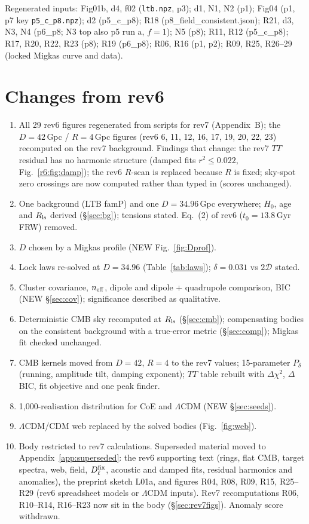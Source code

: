 \documentclass[11pt]{article}
\begin{document}
\noindent Regenerated inputs: Fig01b, d4, f02 (\texttt{ltb.npz}, p3); d1, N1, N2 (p1); Fig04 (p1, p7 key \texttt{p5\_c\_p8.npz}); d2 (p5\_c\_p8); R18 (p8\_field\_consistent.json); R21, d3, N3, N4 (p6\_p8; N3 top also p5 run a, $f=1$); N5 (p8); R11, R12 (p5\_c\_p8); R17, R20, R22, R23 (p8); R19 (p6\_p8); R06, R16 (p1, p2); R09, R25, R26--29 (locked Migkas curve and data).

\section{Changes from rev6}
\begin{enumerate}\itemsep1pt
\item All 29 rev6 figures regenerated from scripts for rev7 (Appendix~B); the $D=42$\,Gpc / $R=4$\,Gpc figures (rev6 6, 11, 12, 16, 17, 19, 20, 22, 23) recomputed on the rev7 background. Findings that change: the rev7 $TT$ residual has no harmonic structure (damped fits $r^2\le0.022$, Fig.~\ref{r6:fig:damp}); the rev6 $R$-scan is replaced because $R$ is fixed; sky-spot zero crossings are now computed rather than typed in (scores unchanged).
\item One background (LTB famP) and one $D=34.96$\,Gpc everywhere; $H_0$, age and $R_{\rm ls}$ derived (\S\ref{sec:bg}); tensions stated. Eq.~(2) of rev6 ($t_0=13.8$\,Gyr FRW) removed.
\item $D$ chosen by a Migkas profile (NEW Fig.~\ref{fig:Dprof}).
\item Lock laws re-solved at $D=34.96$ (Table~\ref{tab:laws}); $\delta=0.031$ vs $2\mathcal D$ stated.
\item Cluster covariance, $n_{\rm eff}$, dipole and dipole + quadrupole comparison, BIC (NEW \S\ref{sec:cov}); significance described as qualitative.
\item Deterministic CMB sky recomputed at $R_{\rm ls}$ (\S\ref{sec:cmb}); compensating bodies on the consistent background with a true-error metric (\S\ref{sec:comp}); Migkas fit checked unchanged.
\item CMB kernels moved from $D=42$, $R=4$ to the rev7 values; 15-parameter $P_\delta$ (running, amplitude tilt, damping exponent); $TT$ table rebuilt with $\Delta\chi^2$, $\Delta$BIC, fit objective and one peak finder.
\item 1,000-realisation distribution for CoE and $\Lambda$CDM (NEW \S\ref{sec:seeds}).
\item $\Lambda$CDM/CDM web replaced by the solved bodies (Fig.~\ref{fig:web}).
\item Body restricted to rev7 calculations. Superseded material moved to Appendix~\ref{app:superseded}: the rev6 supporting text (rings, flat CMB, target spectra, web, field, $D^{\rm fix}_\ell$, acoustic and damped fits, residual harmonics and anomalies), the preprint sketch L01a, and figures R04, R08, R09, R15, R25--R29 (rev6 spreadsheet models or $\Lambda$CDM inputs). Rev7 recomputations R06, R10--R14, R16--R23 now sit in the body (\S\ref{sec:rev7figs}). Anomaly score withdrawn.

\end{enumerate}
\end{document}
